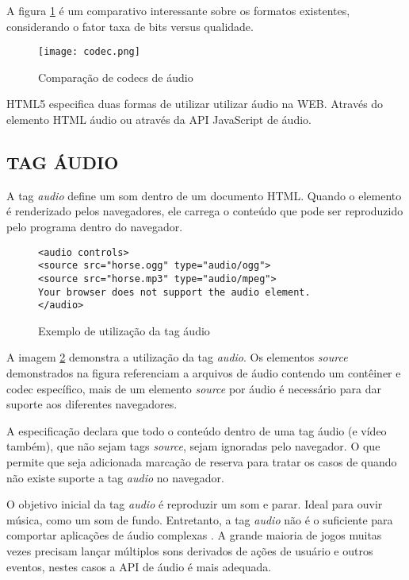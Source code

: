 A figura \ref{fig:audioCodecs} é um comparativo interessante sobre os
formatos existentes, considerando o fator taxa de bits versus qualidade.

\begin{figure}
    \centering
    \texttt{[image: codec.png]}
	\caption{Comparação de codecs de áudio}
    \label{fig:audioCodecs}
\end{figure}

HTML5 especifica duas formas de utilizar utilizar áudio na WEB.
Através do elemento HTML áudio ou através da API JavaScript de áudio.

\subsection{TAG ÁUDIO}

A tag \textit{audio} define um som dentro de um documento HTML. Quando o
elemento é renderizado pelos navegadores, ele carrega o conteúdo que
pode ser reproduzido pelo programa dentro do navegador.

\begin{figure}
\centering
\begin{verbatim}
<audio controls>
<source src="horse.ogg" type="audio/ogg">
<source src="horse.mp3" type="audio/mpeg">
Your browser does not support the audio element.
</audio>
\end{verbatim}
\caption{Exemplo de utilização da tag áudio}
\label{fig:htmlAudio}
\end{figure}

A imagem \ref{fig:htmlAudio} demonstra a utilização da tag
\textit{audio}. Os elementos \textit{source} demonstrados na figura
referenciam a arquivos de áudio contendo um contêiner e codec
específico, mais de um elemento \textit{source } por áudio é
necessário para dar suporte aos diferentes navegadores.

A especificação declara que todo o conteúdo dentro de uma tag áudio
(e vídeo também), que não sejam tags \textit{source}, sejam ignoradas
pelo navegador. O que permite que seja adicionada marcação de reserva
para tratar os casos de quando não existe suporte a tag \textit{audio}
no navegador.

O objetivo inicial da tag \textit{audio} é reproduzir um som e parar.
Ideal para ouvir música, como um som de fundo. Entretanto, a tag
\textit{audio} não é o suficiente para comportar aplicações de
áudio complexas \autocite{audioApiSpec}. A grande maioria de jogos
muitas vezes precisam lançar múltiplos sons derivados de ações
de usuário e outros eventos, nestes casos a API de áudio é mais
adequada.

